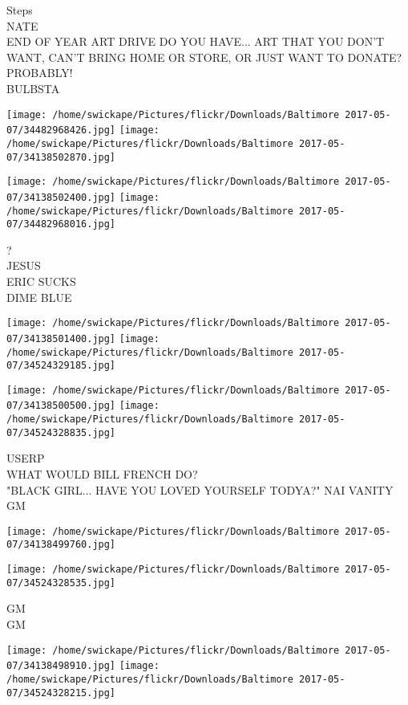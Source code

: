 \documentclass[10pt,letterpaper]{article}
\begin{document}
Steps\\
NATE\\
END OF YEAR ART DRIVE DO YOU HAVE... ART THAT YOU DON'T WANT, CAN'T BRING HOME OR STORE, OR JUST WANT TO DONATE?  PROBABLY!\\
BULBSTA\\
\pagebreak

\texttt{[image: /home/swickape/Pictures/flickr/Downloads/Baltimore 2017-05-07/34482968426.jpg]}
\texttt{[image: /home/swickape/Pictures/flickr/Downloads/Baltimore 2017-05-07/34138502870.jpg]}

\texttt{[image: /home/swickape/Pictures/flickr/Downloads/Baltimore 2017-05-07/34138502400.jpg]}
\texttt{[image: /home/swickape/Pictures/flickr/Downloads/Baltimore 2017-05-07/34482968016.jpg]}

?\\
JESUS\\
ERIC SUCKS\\
DIME BLUE\\
\pagebreak

\texttt{[image: /home/swickape/Pictures/flickr/Downloads/Baltimore 2017-05-07/34138501400.jpg]}
\texttt{[image: /home/swickape/Pictures/flickr/Downloads/Baltimore 2017-05-07/34524329185.jpg]}

\texttt{[image: /home/swickape/Pictures/flickr/Downloads/Baltimore 2017-05-07/34138500500.jpg]}
\texttt{[image: /home/swickape/Pictures/flickr/Downloads/Baltimore 2017-05-07/34524328835.jpg]}

USERP\\
WHAT WOULD BILL FRENCH DO?\\
"BLACK GIRL... HAVE YOU LOVED YOURSELF TODYA?"  NAI VANITY\\
GM\\
\pagebreak

\texttt{[image: /home/swickape/Pictures/flickr/Downloads/Baltimore 2017-05-07/34138499760.jpg]}

\vspace{0.25in}
\texttt{[image: /home/swickape/Pictures/flickr/Downloads/Baltimore 2017-05-07/34524328535.jpg]}

GM\\
GM\\
\pagebreak

\texttt{[image: /home/swickape/Pictures/flickr/Downloads/Baltimore 2017-05-07/34138498910.jpg]}
\texttt{[image: /home/swickape/Pictures/flickr/Downloads/Baltimore 2017-05-07/34524328215.jpg]}
\end{document}
